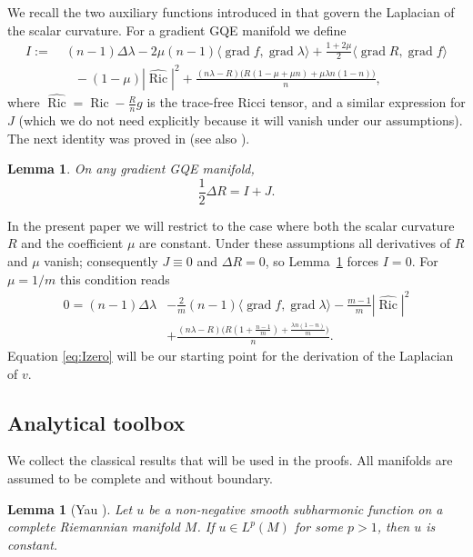 \documentclass[12pt,a4paper]{article}
\newcommand{\Ric}{\operatorname{Ric}}
\newcommand{\grad}{\operatorname{grad}}
\newtheorem{lemma}[theorem]{Lemma}
\theoremstyle{definition}
\theoremstyle{definition}
\begin{document}
We recall the two auxiliary functions introduced in \cite{Mir14} that govern the Laplacian of the scalar curvature.
For a gradient GQE manifold we define
\[
\begin{aligned}
I :=&\; (n-1)\Delta\lambda - 2\mu(n-1)\langle\grad f,\grad\lambda\rangle + \frac{1+2\mu}{2}\langle\grad R,\grad f\rangle \\
&\quad - (1-\mu)|\hat{\Ric}|^2 + \frac{(n\lambda-R)\bigl(R(1-\mu+\mu n) + \mu\lambda n(1-n)\bigr)}{n},
\end{aligned}
\]
where $\hat{\Ric} = \Ric - \frac{R}{n}g$ is the trace-free Ricci tensor, and a similar expression for $J$ (which we do not need explicitly because it will vanish under our assumptions).
The next identity was proved in \cite{Mir14} (see also \cite{Mir15}).
\begin{lemma}\label{lem:I}
On any gradient GQE manifold,
\begin{equation}
\frac12\Delta R = I + J. \label{eq:DeltaR}
\end{equation}
\end{lemma}

In the present paper we will restrict to the case where both the scalar curvature $R$ and the coefficient $\mu$ are constant.
Under these assumptions all derivatives of $R$ and $\mu$ vanish; consequently $J\equiv 0$ and $\Delta R=0$, so Lemma~\ref{lem:I} forces $I=0$.
For $\mu=1/m$ this condition reads
\begin{equation}
\begin{aligned}
0 = (n-1)\Delta\lambda &- \frac{2}{m}(n-1)\langle\grad f,\grad\lambda\rangle - \frac{m-1}{m}|\hat{\Ric}|^2 \\
&+ \frac{(n\lambda-R)\bigl(R(1+\frac{n-1}{m}) + \frac{\lambda n(1-n)}{m}\bigr)}{n}. \label{eq:Izero}
\end{aligned}
\end{equation}
Equation \eqref{eq:Izero} will be our starting point for the derivation of the Laplacian of $v$.

\subsection{Analytical toolbox}
\label{sec:toolbox}

We collect the classical results that will be used in the proofs.
All manifolds are assumed to be complete and without boundary.

\begin{lemma}[Yau \cite{Yau}]\label{lem:Yau}
Let $u$ be a non-negative smooth subharmonic function on a complete Riemannian manifold $M$.
If $u\in L^p(M)$ for some $p>1$, then $u$ is constant.
\end{lemma}
\end{document}
